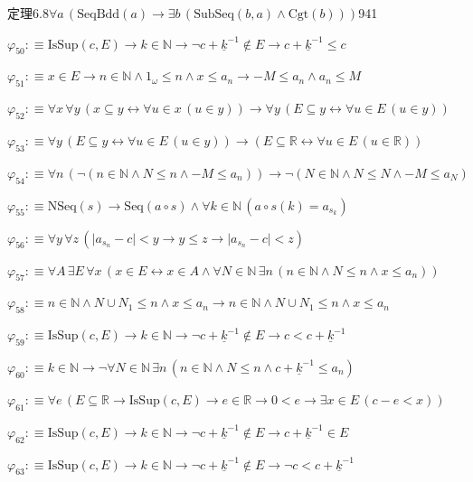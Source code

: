 \begin{fullproof}{定理6.8}{$\forall a\,(\mathrm{SeqBdd}(a) \to \exists b\,(\mathrm{SubSeq}(b,a) \land \mathrm{Cgt}(b)))$}{941}
\begin{abbrevlist}
\item $\varphi_{50} :\equiv \mathrm{IsSup}(c,E) \to k \in \mathbb{N} \to \neg c + \underline{k}^{-1} \notin E \to c + \underline{k}^{-1} \leq c$
\item $\varphi_{51} :\equiv x \in E \to n \in \mathbb{N} \land 1_{\omega} \leq n \land x \leq a_{n} \to -M \leq a_{n} \land a_{n} \leq M$
\item $\varphi_{52} :\equiv \forall x\,\forall y\,(x \subseteq y \leftrightarrow \forall u \in x\,(u \in y)) \to \forall y\,(E \subseteq y \leftrightarrow \forall u \in E\,(u \in y))$
\item $\varphi_{53} :\equiv \forall y\,(E \subseteq y \leftrightarrow \forall u \in E\,(u \in y)) \to (E \subseteq \mathbb{R} \leftrightarrow \forall u \in E\,(u \in \mathbb{R}))$
\item $\varphi_{54} :\equiv \forall n\,(\neg (n \in \mathbb{N} \land N \leq n \land -M \leq a_{n})) \to \neg (N \in \mathbb{N} \land N \leq N \land -M \leq a_{N})$
\item $\varphi_{55} :\equiv \mathrm{NSeq}(s) \to \mathrm{Seq}(a \circ s) \land \forall k \in \mathbb{N}\,(a \circ s(k) = a_{s_{k}})$
\item $\varphi_{56} :\equiv \forall y\,\forall z\,(\lvert a_{s_{n}} - c \rvert < y \to y \leq z \to \lvert a_{s_{n}} - c \rvert < z)$
\item $\varphi_{57} :\equiv \forall A\,\exists E\,\forall x\,(x \in E \leftrightarrow x \in A \land \forall N \in \mathbb{N}\,\exists n\,(n \in \mathbb{N} \land N \leq n \land x \leq a_{n}))$
\item $\varphi_{58} :\equiv n \in \mathbb{N} \land N \cup N_{1} \leq n \land x \leq a_{n} \to n \in \mathbb{N} \land N \cup N_{1} \leq n \land x \leq a_{n}$
\item $\varphi_{59} :\equiv \mathrm{IsSup}(c,E) \to k \in \mathbb{N} \to \neg c + \underline{k}^{-1} \notin E \to c < c + \underline{k}^{-1}$
\item $\varphi_{60} :\equiv k \in \mathbb{N} \to \neg \forall N \in \mathbb{N}\,\exists n\,(n \in \mathbb{N} \land N \leq n \land c + \underline{k}^{-1} \leq a_{n})$
\item $\varphi_{61} :\equiv \forall e\,(E \subseteq \mathbb{R} \to \mathrm{IsSup}(c,E) \to e \in \mathbb{R} \to 0 < e \to \exists x \in E\,(c - e < x))$
\item $\varphi_{62} :\equiv \mathrm{IsSup}(c,E) \to k \in \mathbb{N} \to \neg c + \underline{k}^{-1} \notin E \to c + \underline{k}^{-1} \in E$
\item $\varphi_{63} :\equiv \mathrm{IsSup}(c,E) \to k \in \mathbb{N} \to \neg c + \underline{k}^{-1} \notin E \to \neg c < c + \underline{k}^{-1}$

\end{abbrevlist}
\end{fullproof}
